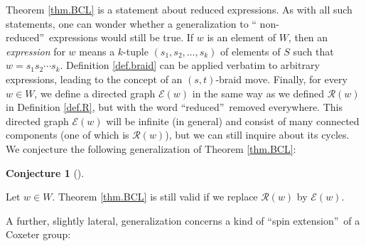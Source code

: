 \documentclass[numbers=enddot,12pt,final,onecolumn,notitlepage,abstracton]{scrartcl}%
\theoremstyle{definition}
\newtheorem{conj}[theo]{Conjecture}
\newenvironment{conjecture}[1][]
{\begin{conj}[#1]\begin{leftbar}}
{\end{leftbar}\end{conj}}
\begin{document}
Theorem \ref{thm.BCL} is a statement about reduced expressions. As with all
such statements, one can wonder whether a generalization to \textquotedblleft
non-reduced\textquotedblright\ expressions would still be true. If $w$ is an
element of $W$, then an \emph{expression} for $w$ means a $k$-tuple $\left(
s_{1},s_{2},\ldots,s_{k}\right)  $ of elements of $S$ such that $w=s_{1}%
s_{2}\cdots s_{k}$. Definition \ref{def.braid} can be applied verbatim to
arbitrary expressions, leading to the concept of an $\left(  s,t\right)
$-braid move. Finally, for every $w\in W$, we define a directed graph
$\mathcal{E}\left(  w\right)  $ in the same way as we defined $\mathcal{R}%
\left(  w\right)  $ in Definition \ref{def.R}, but with the word
\textquotedblleft reduced\textquotedblright\ removed everywhere. This directed
graph $\mathcal{E}\left(  w\right)  $ will be infinite (in general) and
consist of many connected components (one of which is $\mathcal{R}\left(
w\right)  $), but we can still inquire about its cycles. We conjecture the
following generalization of Theorem \ref{thm.BCL}:

\begin{conjecture}
\label{conj.E(w)}Let $w\in W$. Theorem \ref{thm.BCL} is still valid if we
replace $\mathcal{R}\left(  w\right)  $ by $\mathcal{E}\left(  w\right)  $.
\end{conjecture}

A further, slightly lateral, generalization concerns a kind of
\textquotedblleft spin extension\textquotedblright\ of a Coxeter group:
\end{document}
